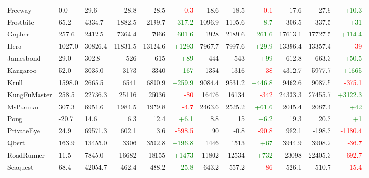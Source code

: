 \documentclass{article} %
\begin{document}
\begin{table}[!t]
{\begin{tabular}{@{}lllrrrrrrrrr@{}}
Freeway & 0.0 & 29.6 & 28.8 & 28.5 & \textcolor{red}{-0.3} & 18.6 & 18.5 & \textcolor{red}{-0.1} & 17.6 & 27.9 & \textcolor{green}{+10.3} \\
Frostbite & 65.2 & 4334.7 & 1882.5 & 2199.7 & \textcolor{green}{+317.2} & 1096.9 & 1105.6 & \textcolor{green}{+8.7} & 306.5 & 337.5 & \textcolor{green}{+31} \\
Gopher & 257.6 & 2412.5 & 7364.4 & 7966 & \textcolor{green}{+601.6} & 1928 & 2189.6 & \textcolor{green}{+261.6} & 17613.1 & 17727.5 & \textcolor{green}{+114.4} \\
Hero & 1027.0 & 30826.4 & 11831.5 & 13124.6 & \textcolor{green}{+1293} & 7967.7 & 7997.6 & \textcolor{green}{+29.9} & 13396.4 & 13357.4 & \textcolor{red}{-39} \\
Jamesbond & 29.0 & 302.8 & 526 & 615 & \textcolor{green}{+89} & 444 & 543 & \textcolor{green}{+99} & 612.8 & 663.3 & \textcolor{green}{+50.5} \\
Kangaroo & 52.0 & 3035.0 & 3173 & 3340 & \textcolor{green}{+167} & 1354 & 1316 & \textcolor{red}{-38} & 4312.7 & 5977.7 & \textcolor{green}{+1665} \\
Krull & 1598.0 & 2665.5 & 6541 & 6800.9 & \textcolor{green}{+259.9} & 9084.4 & 9531.2 & \textcolor{green}{+446.8} & 9462.6 & 9087.5 & \textcolor{red}{-375.1} \\
KungFuMaster & 258.5 & 22736.3 & 25116 & 25036 & \textcolor{red}{-80} & 16476 & 16134 & \textcolor{red}{-342} & 24333.3 & 27455.7 & \textcolor{green}{+3122.3} \\
MsPacman & 307.3 & 6951.6 & 1984.5 & 1979.8 & \textcolor{red}{-4.7} & 2463.6 & 2525.2 & \textcolor{green}{+61.6} & 2045.4 & 2087.4 & \textcolor{green}{+42} \\
Pong & -20.7 & 14.6 & 6.3 & 12.4 & \textcolor{green}{+6.1} & 8.8 & 15 & \textcolor{green}{+6.2} & 19.3 & 20.3 & \textcolor{green}{+1} \\
PrivateEye & 24.9 & 69571.3 & 602.1 & 3.6 & \textcolor{red}{-598.5} & 90 & -0.8 & \textcolor{red}{-90.8} & 982.1 & -198.3 & \textcolor{red}{-1180.4} \\
Qbert & 163.9 & 13455.0 & 3306 & 3502.8 & \textcolor{green}{+196.8} & 1446 & 1513 & \textcolor{green}{+67} & 3944.9 & 3908.2 & \textcolor{red}{-36.7} \\
RoadRunner & 11.5 & 7845.0 & 16682 & 18155 & \textcolor{green}{+1473} & 11802 & 12534 & \textcolor{green}{+732} & 23098 & 22405.3 & \textcolor{red}{-692.7} \\
Seaquest & 68.4 & 42054.7 & 462.4 & 488.2 & \textcolor{green}{+25.8} & 643.2 & 557.2 & \textcolor{red}{-86} & 526.1 & 510.7 & \textcolor{red}{-15.4} \\

\end{tabular}}
\end{table}
\end{document}
